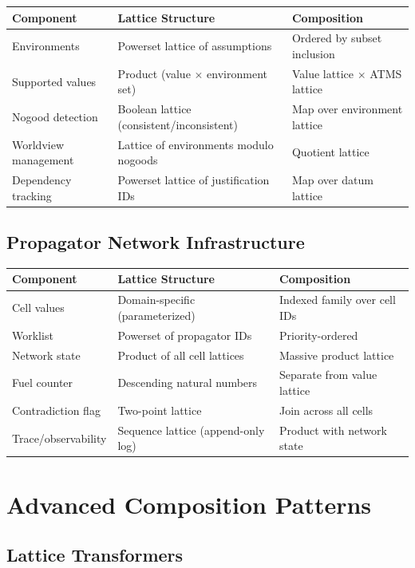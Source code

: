\documentclass[11pt]{article}
\begin{document}
\begin{center}
\begin{tabular}{lll}
Component & Lattice Structure & Composition\\
\hline
Environments & Powerset lattice of assumptions & Ordered by subset inclusion\\
Supported values & Product (value \(\times\) environment set) & Value lattice \(\times\) ATMS lattice\\
Nogood detection & Boolean lattice (consistent/inconsistent) & Map over environment lattice\\
Worldview management & Lattice of environments modulo nogoods & Quotient lattice\\
Dependency tracking & Powerset lattice of justification IDs & Map over datum lattice\\
\end{tabular}
\end{center}
\subsection{Propagator Network Infrastructure}
\label{sec:org9abc32b}

\begin{center}
\begin{tabular}{lll}
Component & Lattice Structure & Composition\\
\hline
Cell values & Domain-specific (parameterized) & Indexed family over cell IDs\\
Worklist & Powerset of propagator IDs & Priority-ordered\\
Network state & Product of all cell lattices & Massive product lattice\\
Fuel counter & Descending natural numbers & Separate from value lattice\\
Contradiction flag & Two-point lattice & Join across all cells\\
Trace/observability & Sequence lattice (append-only log) & Product with network state\\
\end{tabular}
\end{center}
\section{Advanced Composition Patterns}
\label{sec:orgea10b13}

\subsection{Lattice Transformers}
\label{sec:org403861d}
\end{document}
